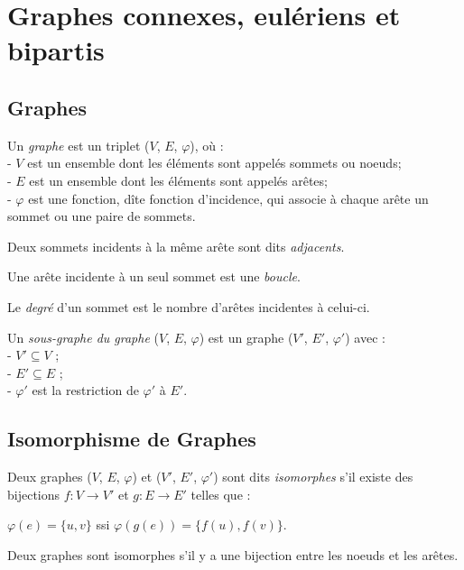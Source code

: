 \section{Graphes connexes, eulériens et bipartis}
\subsection{Graphes}
\begin{mydef}
  Un \emph{graphe} est un triplet ($V$, $E$, $\varphi$), où :\\
  - $V$ est un ensemble dont les éléments sont appelés sommets ou noeuds; \\
  - $E$ est un ensemble dont les éléments sont appelés arêtes; \\
  - $\varphi$ est une fonction, dîte fonction d'incidence, qui associe à chaque arête un sommet ou une paire de sommets. \\
\end{mydef}

\begin{mydef}
  Deux sommets incidents à la même arête sont dits \emph{adjacents}.
\end{mydef}

\begin{mydef}
  Une arête incidente à un seul sommet est une \emph{boucle}.
\end{mydef}

\begin{mydef}
  Le \emph{degré} d'un sommet est le nombre d'arêtes incidentes à celui-ci.
\end{mydef}

\begin{mydef}
  Un \emph{sous-graphe du graphe} ($V$, $E$, $\varphi$) est un graphe ($V'$, $E'$, $\varphi'$) avec : \\
  - $V' \subseteq V$ ; \\
  - $E' \subseteq E$ ; \\
  - $\varphi'$ est la restriction de $\varphi'$ à $E'$.
\end{mydef}

\subsection{Isomorphisme de Graphes}
\begin{mydef}
  Deux graphes ($V$, $E$, $\varphi$) et ($V'$, $E'$, $\varphi'$) sont dits \emph{isomorphes} s'il existe des bijections $f:V \to V'$ et $g:E \to E'$ telles que :
  \begin{center}
    $\varphi(e) = \{u, v\}$ ssi $\varphi(g(e)) = \{f(u), f(v)\}$.
  \end{center}
  Deux graphes sont isomorphes s'il y a une bijection entre les noeuds et les arêtes.
\end{mydef}


